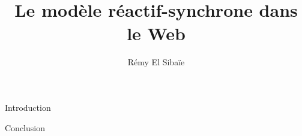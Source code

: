\documentclass{beamer}
\title{Le modèle réactif-synchrone dans le Web}
\author{Rémy El Sibaïe}
\begin{document}
\begin{frame}
  \titlepage  
\end{frame}


\begin{frame}{Introduction}
  
\end{frame}


\begin{frame}{Conclusion}
\end{frame}
\end{document}
